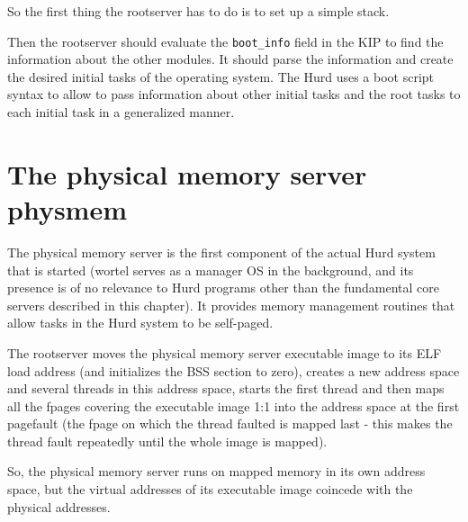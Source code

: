 So the first thing the rootserver has to do is to set up a simple
stack.

Then the rootserver should evaluate the \verb/boot_info/ field in the
KIP to find the information about the other modules.  It should parse
the information and create the desired initial tasks of the operating
system.  The Hurd uses a boot script syntax to allow to pass
information about other initial tasks and the root tasks to each
initial task in a generalized manner.

\begin{comment}
  The exact number and type of initial tasks necessary to boot the
  Hurd are not yet known.  Chances are that this list includes the
  \texttt{task} server, the physical memory server, the device
  servers, and the boot filesystem.  The boot filesystem might be a
  small simple filesystem, which also includes the device drivers
  needed to access the real root filesystem.
\end{comment}


\section{The physical memory server physmem}

The physical memory server is the first component of the actual Hurd
system that is started (wortel serves as a manager OS in the
background, and its presence is of no relevance to Hurd programs other
than the fundamental core servers described in this chapter).  It
provides memory management routines that allow tasks in the Hurd
system to be self-paged.

The rootserver moves the physical memory server executable image to
its ELF load address (and initializes the BSS section to zero),
creates a new address space and several threads in this address space,
starts the first thread and then maps all the fpages covering the
executable image 1:1 into the address space at the first pagefault
(the fpage on which the thread faulted is mapped last - this makes the
thread fault repeatedly until the whole image is mapped).

\begin{comment}
  Wortel should follow the \texttt{exec()} protocol to startup the new
  task as closely as possible.  However, there is little that wortel
  can provide to physmem in this terms.
\end{comment}

So, the physical memory server runs on mapped memory in its own
address space, but the virtual addresses of its executable image
coincede with the physical addresses.

